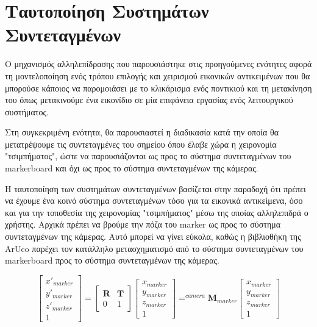 \section{Tαυτοποίηση Συστημάτων Συντεταγμένων}



Ο μηχανισμός αλληλεπίδρασης που παρουσιάστηκε στις προηγούμενες ενότητες αφορά τη μοντελοποίηση ενός τρόπου επιλογής και χειρισμού εικονικών αντικειμένων που θα μπορούσε κάποιος να παρομοιάσει με το κλικάρισμα ενός ποντικιού και τη μετακίνηση του όπως μετακινούμε ένα εικονίδιο σε μία επιφάνεια εργασίας ενός λειτουργικού συστήματος.


Στη συγκεκριμένη ενότητα, θα παρουσιαστεί η διαδικασία κατά την οποία θα μετατρέψουμε τις συντεταγμένες του σημείου όπου έλαβε χώρα η χειρονομία "τσιμπήματος", ώστε να παρουσιάζονται ως προς το σύστημα συντεταγμένων του markerboard και όχι ως προς το σύστημα συντεταγμένων της κάμερας.


Η ταυτοποίηση των συστημάτων συντεταγμένων βασίζεται στην παραδοχή ότι πρέπει να έχουμε ένα κοινό σύστημα συντεταγμένων τόσο για τα εικονικά αντικείμενα, όσο και για την τοποθεσία της χειρονομίας "τσιμπήματος" μέσω της οποίας αλληλεπιδρά ο χρήστης. Αρχικά πρέπει να βρούμε την πόζα του marker ως προς το σύστημα συντεταγμένων της κάμερας. Αυτό μπορεί να γίνει εύκολα, καθώς η βιβλιοθήκη της ArUco παρέχει τον κατάλληλο μετασχηματισμό από το σύστημα συντεταγμένων του markerboard προς το σύστημα συντεταγμένων της κάμερας.



\begin{equation}
\begin{bmatrix}
x'_{marker} \\ y'_{marker} \\ z'_{marker} \\ 1
\end{bmatrix}
=
\begin{bmatrix}
\mathbf{R} & \mathbf{T}\\ 
0 & 1
\end{bmatrix}
\begin{bmatrix}
x_{marker} \\ y_{marker} \\ z_{marker} \\ 1
\end{bmatrix}
=
^{camera}\mathbf{M}_{marker}
\begin{bmatrix}
x_{marker} \\ y_{marker} \\ z_{marker} \\ 1
\end{bmatrix}
\end{equation}

